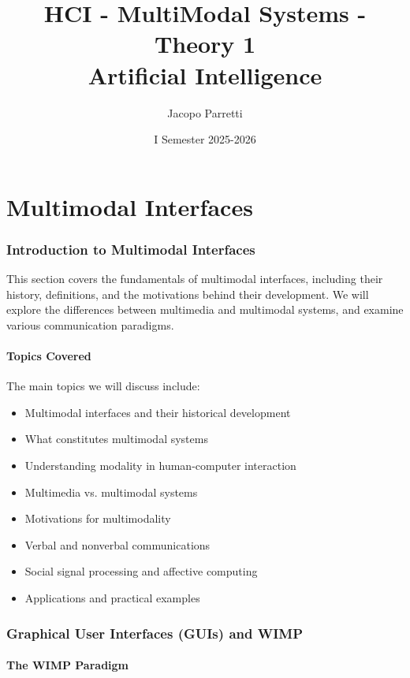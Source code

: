 \documentclass[11pt,a4paper]{article}
\title{\textbf{HCI - MultiModal Systems - Theory 1}\\
\large Artificial Intelligence}
\author{Jacopo Parretti}
\date{I Semester 2025-2026}
\theoremstyle{definition}
\theoremstyle{plain}
\theoremstyle{remark}
\begin{document}
\maketitle
\newpage
\tableofcontents
\newpage



\part{Multimodal Interfaces}

\section{Introduction to Multimodal Interfaces}

This section covers the fundamentals of multimodal interfaces, including their history, definitions, and the motivations behind their development. We will explore the differences between multimedia and multimodal systems, and examine various communication paradigms.

\subsection{Topics Covered}

The main topics we will discuss include:
\begin{itemize}
    \item Multimodal interfaces and their historical development
    \item What constitutes multimodal systems
    \item Understanding modality in human-computer interaction
    \item Multimedia vs. multimodal systems
    \item Motivations for multimodality
    \item Verbal and nonverbal communications
    \item Social signal processing and affective computing
    \item Applications and practical examples
\end{itemize}

\section{Graphical User Interfaces (GUIs) and WIMP}

\subsection{The WIMP Paradigm}
\end{document}
